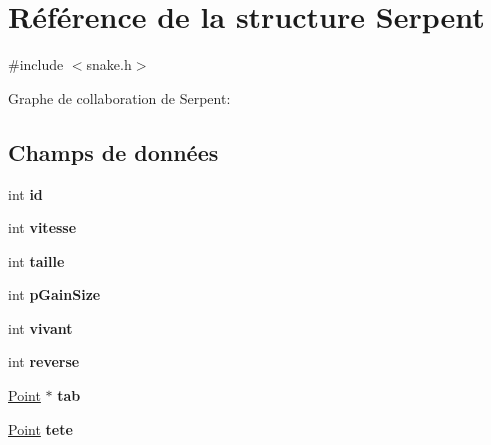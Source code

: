 \hypertarget{struct_serpent}{\section{Référence de la structure Serpent}
\label{struct_serpent}
}


{\ttfamily \#include $<$snake.\-h$>$}



Graphe de collaboration de Serpent\-:
\subsection*{Champs de données}
\begin{DoxyCompactItemize}
\item 
\hypertarget{struct_serpent_a7441ef0865bcb3db9b8064dd7375c1ea}{int {\bfseries id}}\label{struct_serpent_a7441ef0865bcb3db9b8064dd7375c1ea}

\item 
\hypertarget{struct_serpent_a4b512d0a6dcc3c7d7e6dd9a7714852c4}{int {\bfseries vitesse}}\label{struct_serpent_a4b512d0a6dcc3c7d7e6dd9a7714852c4}

\item 
\hypertarget{struct_serpent_a29bf3fc0ffe4e72e45f0c84ab4f8cd1e}{int {\bfseries taille}}\label{struct_serpent_a29bf3fc0ffe4e72e45f0c84ab4f8cd1e}

\item 
\hypertarget{struct_serpent_a548c901f9a4e3f1cd78d94e8b9c7f6d4}{int {\bfseries p\-Gain\-Size}}\label{struct_serpent_a548c901f9a4e3f1cd78d94e8b9c7f6d4}

\item 
\hypertarget{struct_serpent_aedecaf717e967a68b10fc0623e8d74f8}{int {\bfseries vivant}}\label{struct_serpent_aedecaf717e967a68b10fc0623e8d74f8}

\item 
\hypertarget{struct_serpent_ae6ebe94aa9f2d314eb937d8a3042763f}{int {\bfseries reverse}}\label{struct_serpent_ae6ebe94aa9f2d314eb937d8a3042763f}

\item 
\hypertarget{struct_serpent_ad44190bd0d6846f34b2f440d8b028653}{\hyperlink{struct_point}{Point} $\ast$ {\bfseries tab}}\label{struct_serpent_ad44190bd0d6846f34b2f440d8b028653}

\item 
\hypertarget{struct_serpent_a7029c13111e60317aa11bbabd7a6dd66}{\hyperlink{struct_point}{Point} {\bfseries tete}}\label{struct_serpent_a7029c13111e60317aa11bbabd7a6dd66}


\end{DoxyCompactItemize}
